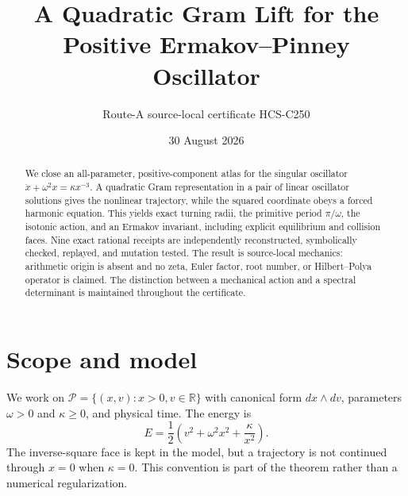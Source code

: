 \documentclass[10pt]{article}
\title{A Quadratic Gram Lift for the Positive Ermakov--Pinney Oscillator}
\author{Route-A source-local certificate HCS-C250}
\date{30 August 2026}
\newcommand{\R}{\mathbb R}
\begin{document}
\maketitle
\begin{abstract}
We close an all-parameter, positive-component atlas for the singular oscillator
$\ddot x+\omega^2x=\kappa x^{-3}$.  A quadratic Gram representation in a pair of
linear oscillator solutions gives the nonlinear trajectory, while the squared
coordinate obeys a forced harmonic equation.  This yields exact turning radii,
the primitive period $\pi/\omega$, the isotonic action, and an Ermakov invariant,
including explicit equilibrium and collision faces.  Nine exact rational receipts
are independently reconstructed, symbolically checked, replayed, and mutation
tested.  The result is source-local mechanics: arithmetic origin is absent and
no zeta, Euler factor, root number, or Hilbert--Polya operator is claimed.
The distinction between a mechanical action and a spectral determinant is
maintained throughout the certificate.
\end{abstract}

\section{Scope and model}
We work on $\mathcal P=\{(x,v):x>0,v\in\R\}$ with canonical form $dx\wedge dv$,
parameters $\omega>0$ and $\kappa\geq0$, and physical time.  The energy is
\begin{equation}
 E=\frac12\left(v^2+\omega^2x^2+\frac{\kappa}{x^2}\right).
 \label{eq:E}
\end{equation}
The inverse-square face is kept in the model, but a trajectory is not continued
through $x=0$ when $\kappa=0$.  This convention is part of the theorem rather
than a numerical regularization.
\end{document}
